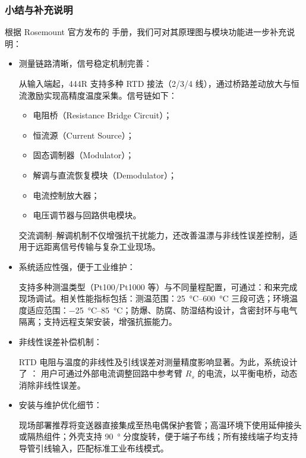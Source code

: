 \subsubsection{小结与补充说明}

根据 Rosemount 官方发布的  手册，我们可对其原理图与模块功能进一步补充说明：
\begin{itemize}
	\item 测量链路清晰，信号稳定机制完善：
	
	从输入端起，444R 支持多种 RTD 接法（2/3/4 线），通过桥路差动放大与恒流激励实现高精度温度采集。信号链如下：
	\begin{itemize}
		\item 电阻桥（Resistance Bridge Circuit）；
		\item 恒流源（Current Source）；
		\item 固态调制器（Modulator）；
		\item 解调与直流恢复模块（Demodulator）；
		\item 电流控制放大器；
		\item 电压调节器与回路供电模块。
	\end{itemize}
	交流调制–解调机制不仅增强抗干扰能力，还改善温漂与非线性误差控制，适用于远距离信号传输与复杂工业现场。
	
	\item 系统适应性强，便于工业维护：
	
	支持多种测温类型（Pt100/Pt1000 等）与不同量程配置，可通过：和来完成现场调试。相关性能指标包括：测温范围：\SIrange{25}{600}{\degreeCelsius} 三段可选；环境温度适应范围：\SIrange{-25}{85}{\degreeCelsius}；防爆、防腐、防湿结构设计，含密封环与电气隔离；支持远程支架安装，增强抗振能力。
	
	\item 非线性误差补偿机制：
	
	RTD 电阻与温度的非线性及引线误差对测量精度影响显著。为此，系统设计了 ：  
	用户可通过外部电流调整回路中参考臂 $R_s$ 的电流，以平衡电桥，动态消除非线性误差。
	
	\item 安装与维护优化细节：
	
	现场部署推荐将变送器直接集成至热电偶保护套管；高温环境下使用延伸接头或隔热组件；外壳支持 \SI{90}{\degree} 分度旋转，便于端子布线；所有接线端子均支持导管引线输入，匹配标准工业布线模式。
\end{itemize}


